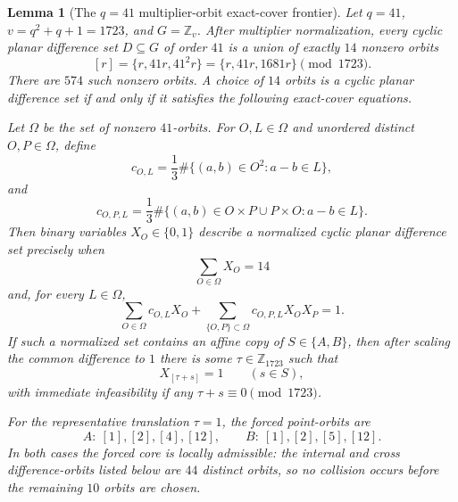 \documentclass[11pt,letterpaper]{amsart}
\theoremstyle{plain}
\newtheorem{lemma}[theorem]{Lemma}
\newcommand{\Z}{\mathbb Z}
\begin{document}
\begin{lemma}[The \(q=41\) multiplier-orbit exact-cover frontier]
\label{lem:q41}
Let \(q=41\), \(v=q^2+q+1=1723\), and \(G=\Z_v\).  After multiplier
normalization, every cyclic planar difference set \(D\subseteq G\) of
order \(41\) is a union of exactly \(14\) nonzero orbits
\[
 [r]=\{r,41r,41^2r\}=\{r,41r,1681r\}\pmod {1723}.
\]
There are \(574\) such nonzero orbits.  A choice of \(14\) orbits is a
cyclic planar difference set if and only if it satisfies the following
exact-cover equations.

Let \(\Omega\) be the set of nonzero \(41\)-orbits.  For \(O,L\in\Omega\)
and unordered distinct \(O,P\in\Omega\), define
\[
 c_{O,L}
 =\frac{1}{3}\#\{(a,b)\in O^2:a-b\in L\},
\]
and
\[
 c_{O,P,L}
 =\frac{1}{3}\#\{(a,b)\in O\times P\cup P\times O:a-b\in L\}.
\]
Then binary variables \(X_O\in\{0,1\}\) describe a normalized cyclic
planar difference set precisely when
\[
 \sum_{O\in\Omega}X_O=14
\]
and, for every \(L\in\Omega\),
\[
 \sum_{O\in\Omega}c_{O,L}X_O
 +\sum_{\{O,P\}\subset\Omega}c_{O,P,L}X_OX_P=1.
\]
If such a normalized set contains an affine copy of
\(S\in\{A,B\}\), then after scaling the common difference to \(1\) there
is some \(\tau\in\Z_{1723}\) such that
\[
 X_{[\tau+s]}=1\qquad(s\in S),
\]
with immediate infeasibility if any \(\tau+s\equiv0\pmod {1723}\).

For the representative translation \(\tau=1\), the forced point-orbits
are
\[
 A:\ [1],[2],[4],[12],
 \qquad
 B:\ [1],[2],[5],[12].
\]
In both cases the forced core is locally admissible: the internal and
cross difference-orbits listed below are \(44\) distinct orbits, so no
collision occurs before the remaining \(10\) orbits are chosen.
\end{lemma}
\end{document}
